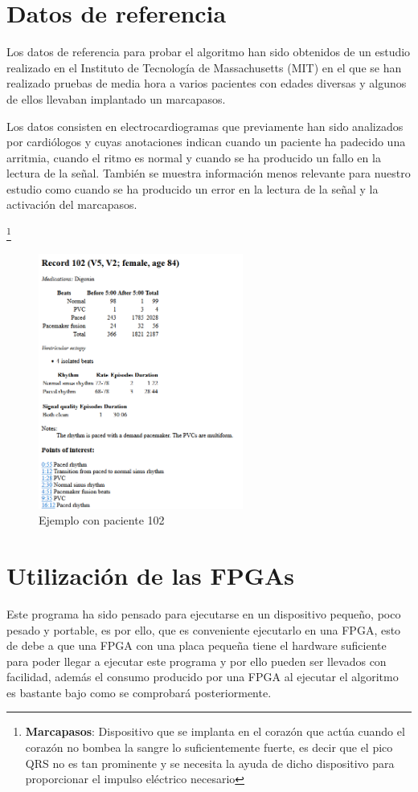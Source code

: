 \section{Datos de referencia}
Los datos de referencia para probar el algoritmo han sido obtenidos de un estudio realizado en el Instituto de Tecnología de Massachusetts (MIT)
en el que se han realizado pruebas de media hora a varios pacientes con edades diversas y algunos de ellos llevaban implantado un marcapasos.

Los datos consisten en electrocardiogramas que previamente han sido analizados por cardiólogos y cuyas anotaciones indican cuando un paciente ha padecido 
una arritmia, cuando el ritmo es normal y cuando se ha producido un fallo en la lectura de la señal. También se muestra información menos relevante para nuestro 
estudio como cuando se ha producido un error en la lectura de la señal y la activación del marcapasos.

\footnote{\textbf{Marcapasos}: Dispositivo que se implanta en el corazón que actúa cuando el corazón no bombea la sangre lo suficientemente fuerte, es decir que el pico QRS no es tan prominente
y se necesita la ayuda de dicho dispositivo para proporcionar el impulso eléctrico necesario}
\begin{figure}[h]
	\centering
	\includegraphics[width=0.6\textwidth]{./Images/img_introduccion/Paciente_pruebas_MIT.png}
	\caption{Ejemplo con paciente 102 \cite{mitdb}}
	\label{fig:Paciente_pruebas_MIT}
\end{figure}

\section{Utilización de las FPGAs}
Este programa ha sido pensado para ejecutarse en un dispositivo pequeño, poco pesado y portable, es por ello, que es conveniente ejecutarlo en 
una FPGA, esto de debe a que una FPGA con una placa pequeña tiene el hardware suficiente para poder llegar a ejecutar este programa y por ello pueden
ser llevados con facilidad, además el consumo producido por una FPGA al ejecutar el algoritmo es bastante bajo como se comprobará posteriormente.

